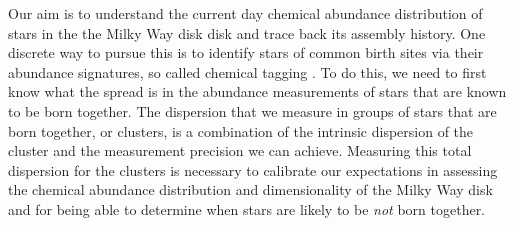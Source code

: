\documentclass[14pt, preprint2]{aastex6}
\newcommand{\project}[1]{\textsl{#1}}
\newcommand{\apogee}{\project{\textsc{apogee}}}
\newcommand{\alphafe}{\mbox{$\rm [\alpha/Fe]$}}
\begin{document}

Our aim is to understand the current day chemical abundance distribution of stars in the the Milky Way disk disk and trace back its assembly history. One discrete way to pursue this is to identify stars of common birth sites via their abundance signatures, so called chemical tagging \citep{freeman2002}. To do this, we need to first know what the spread is in the abundance measurements of stars that are known to be born together.  The dispersion that we measure in groups of stars that are born together, or clusters, is a combination of the intrinsic dispersion of the cluster and the measurement precision we can achieve. Measuring this total dispersion for the clusters is necessary to calibrate our expectations in assessing the chemical abundance distribution and dimensionality of the Milky Way disk and for being able to determine when stars are likely to be \textit{not} born together. 
\end{document}
